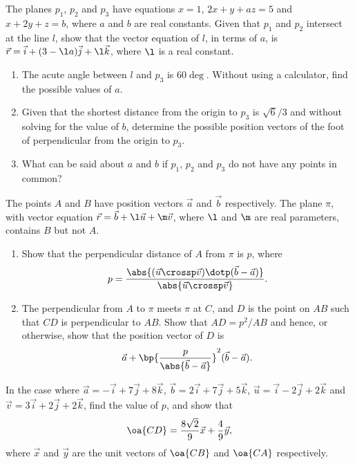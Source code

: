 \begin{problem}
    The planes $p_1$, $p_2$ and $p_3$ have equations $x = 1$, $2x + y + az = 5$ and $x + 2y + z = b$, where $a$ and $b$ are real constants. Given that $p_1$ and $p_2$ intersect at the line $l$, show that the vector equation of $l$, in terms of $a$, is $\vec r = \vec i + (3 - \l a)\vec j + \l \vec k$, where $\l$ is a real constant.

    \begin{enumerate}
        \item The acute angle between $l$ and $p_3$ is $60\deg$. Without using a calculator, find the possible values of $a$.
        \item Given that the shortest distance from the origin to $p_3$ is $\sqrt6 / 3$ and without solving for the value of $b$, determine the possible position vectors of the foot of perpendicular from the origin to $p_3$.
        \item What can be said about $a$ and $b$ if $p_1$, $p_2$ and $p_3$ do not have any points in common?
    \end{enumerate}
\end{problem}

\begin{problem}[\chili]
    The points $A$ and $B$ have position vectors $\vec a$ and $\vec b$ respectively. The plane $\pi$, with vector equation $\vec r = \vec b + \l \vec u + \m \vec v$, where $\l$ and $\m$ are real parameters, contains $B$ but not $A$.

    \begin{enumerate}
        \item Show that the perpendicular distance of $A$ from $\pi$ is $p$, where \[p = \frac{\abs{(\vec u \crossp \vec v) \dotp (\vec b - \vec a)}}{\abs{\vec u \crossp \vec v}}.\]
        \item The perpendicular from $A$ to $\pi$ meets $\pi$ at $C$, and $D$ is the point on $AB$ such that $CD$ is perpendicular to $AB$. Show that $AD = p^2 / AB$ and hence, or otherwise, show that the position vector of $D$ is \[\vec a + \bp{\frac{p}{\abs{\vec b - \vec a}}}^2 (\vec b - \vec a).\]
    \end{enumerate}

    In the case where $\vec a = -\vec i + 7\vec j + 8\vec k$, $\vec b = 2\vec i + 7\vec j + 5\vec k$, $\vec u = \vec i - 2\vec j + 2\vec k$ and $\vec v = 3\vec i + 2\vec j + 2\vec k$, find the value of $p$, and show that \[\oa{CD} = \frac{8\sqrt{2}}9 \vec x + \frac49 \vec y,\] where $\vec x$ and $\vec y$ are the unit vectors of $\oa{CB}$ and $\oa{CA}$ respectively.
\end{problem}
